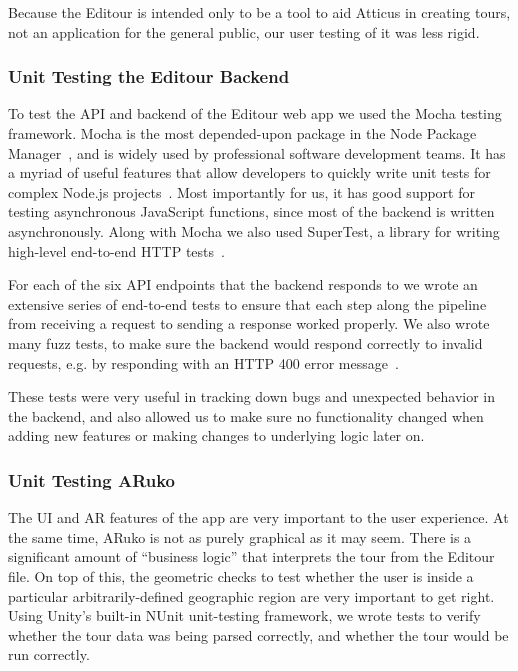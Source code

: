 \documentclass[a4paper, 10pt, american, titlepage]{article}
\begin{document}
Because the Editour is intended only to be a tool to aid Atticus in creating
tours, not an application for the general public, our user testing of it was less
rigid.

\subsubsection{Unit Testing the Editour Backend}
\label{sec:unitTestingTheEditourBackend}

To test the API and backend of the Editour web app we used the Mocha testing
framework. Mocha is the most depended-upon package in the Node Package
Manager~\autocite{tidelift2019}, and is widely used by professional software
development teams. It has a myriad of useful features that allow developers to
quickly write unit tests for complex Node.js projects~\autocite{mochajs2019}.
Most importantly for us, it has good support for testing asynchronous JavaScript
functions, since most of the backend is written asynchronously. Along with Mocha
we also used SuperTest, a library for writing high-level end-to-end HTTP
tests~\autocite{supertest2019}.

For each of the six API endpoints that the backend responds to we wrote an
extensive series of end-to-end tests to ensure that each step along the pipeline
from receiving a request to sending a response worked properly. We also wrote
many fuzz tests, to make sure the backend would respond correctly to invalid
requests, e.g. by responding with an HTTP 400 error message~\autocite{rfc7231}.

These tests were very useful in tracking down bugs and unexpected behavior in
the backend, and also allowed us to make sure no functionality changed when
adding new features or making changes to underlying logic later on.

\subsubsection{Unit Testing ARuko}
\label{sec:unitTestingARuko}

The UI and AR features of the app are very important to the user experience. At
the same time, ARuko is not as purely graphical as it may seem. There is a
significant amount of ``business logic'' that interprets the tour from the
Editour file. On top of this, the geometric checks to test whether the user is
inside a particular arbitrarily-defined geographic region are very important to
get right.  Using Unity's built-in NUnit unit-testing framework, we wrote tests
to verify whether the tour data was being parsed correctly, and whether the tour
would be run correctly.
\end{document}
